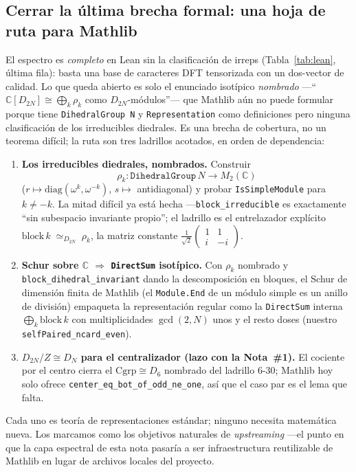 \documentclass[11pt]{article}
\newcommand{\lean}[1]{\texttt{#1}}
\begin{document}
\subsection*{Cerrar la \'ultima brecha formal: una hoja de ruta para Mathlib}
El espectro es \emph{completo} en Lean sin la clasificaci\'on de irreps (Tabla~\ref{tab:lean}, \'ultima fila):
basta una base de caracteres DFT tensorizada con un dos-vector de calidad. Lo que queda abierto es solo el
enunciado isot\'ipico \emph{nombrado} ---``$\mathbb{C}[D_{2N}]\cong\bigoplus_k\rho_k$ como $D_{2N}$-m\'odulos''---
que Mathlib a\'un no puede formular porque tiene \lean{DihedralGroup N} y \lean{Representation} como
definiciones pero ninguna clasificaci\'on de los irreducibles diedrales. Es una brecha de cobertura, no un
teorema dif\'icil; la ruta son tres ladrillos acotados, en orden de dependencia:
\begin{enumerate}\setlength\itemsep{1pt}
  \item \textbf{Los irreducibles diedrales, nombrados.} Construir
        \[\rho_k:\lean{DihedralGroup}\,N\to M_2(\mathbb{C})\]
        ($r\mapsto\mathrm{diag}(\omega^{k},\omega^{-k})$, $s\mapsto$ antidiagonal) y probar
        \lean{IsSimpleModule} para $k\neq-k$. La mitad dif\'icil ya est\'a hecha ---\lean{block\_irreducible} es
        exactamente ``sin subespacio invariante propio''; el ladrillo es el entrelazador expl\'icito
        $\mathrm{block}\,k\;\simeq_{D_{2N}}\;\rho_k$, la matriz constante
        $\tfrac1{\sqrt2}\left(\begin{smallmatrix}1&1\\ i&-i\end{smallmatrix}\right)$.
  \item \textbf{Schur sobre $\mathbb{C}$ $\Rightarrow$ \lean{DirectSum} isot\'ipico.} Con $\rho_k$ nombrado y
        \lean{block\_dihedral\_invariant} dando la descomposici\'on en bloques, el Schur de dimensi\'on finita de
        Mathlib (el \lean{Module.End} de un m\'odulo simple es un anillo de divisi\'on) empaqueta la
        representaci\'on regular como la \lean{DirectSum} interna $\bigoplus_k\mathrm{block}\,k$ con
        multiplicidades $\gcd(2,N)$ unos y el resto doses (nuestro \lean{selfPaired\_ncard\_even}).
  \item \textbf{$D_{2N}/Z\cong D_{N}$ para el centralizador (lazo con la Nota~\#1).} El cociente por el centro
        cierra el $\mathrm{Cgrp}\cong D_{6}$ nombrado del ladrillo $6$-$30$; Mathlib hoy solo ofrece
        \lean{center\_eq\_bot\_of\_odd\_ne\_one}, as\'i que el caso par es el lema que falta.
\end{enumerate}
\noindent Cada uno es teor\'ia de representaciones est\'andar; ninguno necesita matem\'atica nueva. Los
marcamos como los objetivos naturales de \emph{upstreaming} ---el punto en que la capa espectral de esta nota
pasar\'ia a ser infraestructura reutilizable de Mathlib en lugar de archivos locales del proyecto.
\end{document}
